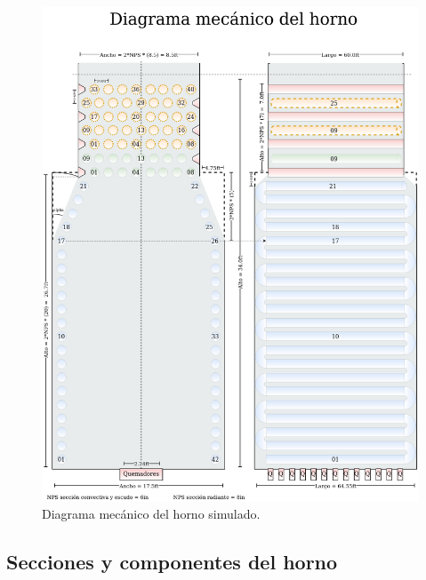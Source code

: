 \begin{figure}[hbt]
\begin{center}
\includegraphics[scale=0.38]{images/diagrama-meca}
\caption[Diagrama mecánico]{Diagrama mecánico del horno simulado.}
\label{fig:diagrama-meca}
\end{center}
\end{figure}

\subsection{Secciones y componentes del horno}
